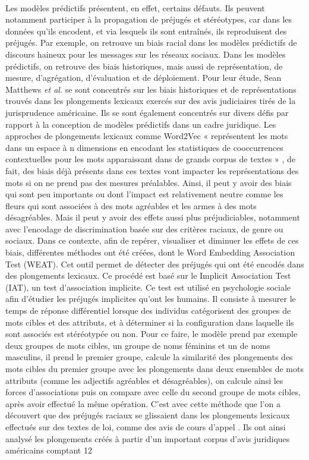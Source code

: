 \documentclass{article}
\begin{document}
\paragraph{}
Les modèles prédictifs présentent, en effet, certains défauts. Ils peuvent notamment participer à la propagation de préjugés et stéréotypes, car dans les données qu’ils encodent, et via lesquels ils sont entraînés, ils reproduisent des préjugés. Par exemple, on retrouve un biais racial dans les modèles prédictifs de discours haineux pour les messages sur les réseaux sociaux. Dans les modèles prédictifs, on retrouve des biais historiques, mais aussi de représentation, de mesure, d’agrégation, d’évaluation et de déploiement. Pour leur étude, Sean Matthews \textit{et al.} se sont concentrés sur les biais historiques et de représentations trouvés dans les plongements lexicaux exercés sur des avis judiciaires tirés de la jurisprudence américaine. Ils se sont également concentrés sur divers défis par rapport à la conception de modèles prédictifs dans un cadre juridique. Les approches de plongements lexicaux comme Word2Vec « représentent les mots dans un espace à n dimensions en encodant les statistiques de cooccurrences contextuelles pour les mots apparaissant dans de grands corpus de textes » \cite[p. 1]{matthews2022gender}, de fait, des biais déjà présents dans ces textes vont impacter les représentations des mots si on ne prend pas des mesures préalables. Ainsi, il peut y avoir des biais qui sont peu importants ou dont l’impact est relativement neutre comme les fleurs qui sont associées à des mots agréables et les armes à des mots désagréables. Mais il peut y avoir des effets aussi plus préjudiciables, notamment avec l’encodage de discrimination basée sur des critères raciaux, de genre ou sociaux. Dans ce contexte, afin de repérer, visualiser et diminuer les effets de ces biais, différentes méthodes ont été créées, dont le Word Embedding Association Test (WEAT). Cet outil permet de détecter des préjugés qui ont été encodés dans des plongements lexicaux. Ce procédé est basé sur le Implicit Association Test (IAT), un test d’association implicite. Ce test est utilisé en psychologie sociale afin d’étudier les préjugés implicites qu’ont les humains. Il consiste à mesurer le temps de réponse différentiel lorsque des individus catégorisent des groupes de mots cibles et des attributs, et à déterminer si la configuration dans laquelle ils sont associés est stéréotypée ou non. Pour ce faire, le modèle prend par exemple deux groupes de mots cibles, un groupe de noms féminins et un de noms masculins, il prend le premier groupe, calcule la similarité des plongements des mots cibles du premier groupe avec les plongements dans deux ensembles de mots attributs (comme les adjectifs agréables et désagréables), on calcule ainsi les forces d’associations puis on compare avec celle du second groupe de mots cibles, après avoir effectué la même opération. C’est avec cette méthode que l’on a découvert que des préjugés raciaux se glissaient dans les plongements lexicaux effectués sur des textes de loi, comme des avis de cours d’appel \cite[p. 2]{matthews2022gender}. Ils ont ainsi analysé les plongements créés à partir d’un important corpus d’avis juridiques américains comptant 12 
\end{document}
